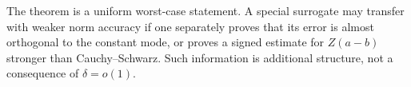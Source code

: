 \begin{remark}
The theorem is a uniform worst-case statement.  A special surrogate
may transfer with weaker norm accuracy if one separately proves
that its error is almost orthogonal to the constant mode, or proves
a signed estimate for \(Z(a-b)\) stronger than Cauchy--Schwarz.
Such information is additional structure, not a consequence of
\(\delta=o(1)\).
\end{remark}

